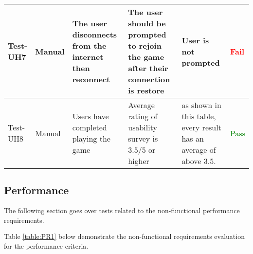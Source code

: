 \documentclass[12pt, titlepage]{article}
\begin{document}
\begin{table}[H]
{\begin{tabular}{|l|p{0.15\linewidth}|p{0.3\linewidth}|p{0.3\linewidth}|p{0.3\linewidth}|p{0.1\linewidth}|}
\hline
Test-UH7 & Manual & The user disconnects from the internet then reconnect & The user should be prompted to rejoin the game after their
connection is restore & User is not prompted  & \textcolor{Red}{Fail} \\
\hline
Test-UH8 & Manual & Users have completed playing the game & Average rating of usability survey is 3.5/5 or higher & \nameref{table:US1} as shown in this table, every result has an average of above 3.5.  & \textcolor{Green}{Pass} \\
\hline
\end{tabular}}
\label{table:UH1}
\end{table}
  
\subsection{Performance}

The following section goes over tests related to the non-functional performance requirements.


Table \ref{table:PR1} below demonstrate the non-functional requirements evaluation for the performance criteria.
\end{document}
